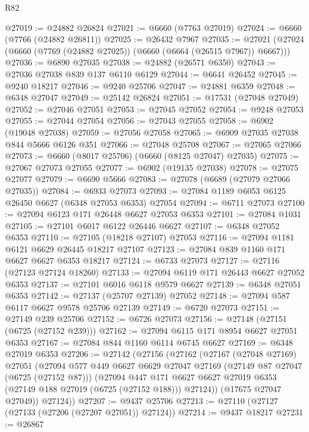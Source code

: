 \begin{lexlean}{R82}
\begin{coremodule}
@27019 := @24882 @26824
@27021 := @6660 (@7763 @27019)
@27024 := @6660 (@7766 (@24882 @26811))
@27025 := @26432 @7967
@27035 := @27021 (@27024 (@6660 (@7769 (@24882 @27025)) (@6660 (@6664 (@26515 @7967)) @6667)))
@27036 := @6890 @27035
@27038 := @24882 (@26571 @6350)
@27043 := @27036 @27038 @839 @137 @6110 @6129
@27044 := @6641 @26452
@27045 := @9240 @18217
@27046 := @9240 @25706
@27047 := @24881 @6359
@27048 := @6348 @27047
@27049 := @25142 @26824
@27051 := @17531 (@27048 @27049)
@27052 := @27046 @27051
@27053 := @27045 @27052
@27054 := @9248 @27053
@27055 := @27044 @27054
@27056 := @27043 @27055
@27058 := @6902 (@19048 @27038)
@27059 := @27056 @27058
@27065 := @6909 @27035 @27038 @844 @5666 @6126 @351
@27066 := @27048 @25708
@27067 := @27065 @27066
@27073 := @6660 (@8017 @25706) (@6660 (@8125 @27047) @27035)
@27075 := @27067 @27073 @27055
@27077 := @6902 (@19135 @27038)
@27078 := @27075 @27077
@27079 := @6690 @5666
@27083 := @27078 (@6689 (@27079 @27066 @27035))
@27084 := @6933 @27073
@27093 := @27084 @1189 @6053 @6125 @26450 @6627 (@6348 @27053 @6353) @27054
@27094 := @6711 @27073
@27100 := @27094 @6123 @171 @26448 @6627 @27053 @6353
@27101 := @27084 @1031
@27105 := @27101 @6017 @6122 @26446 @6627
@27107 := @6348 @27052 @6353
@27110 := @27105 (@18218 @27107) @27053
@27116 := @27094 @1181 @6121 @6629 @26445 @18217 @27107
@27123 := @27084 @839 @1160 @171 @6627 @6627 @6353 @18217
@27124 := @6733 @27073
@27127 := @27116 (@27123 @27124 @18260)
@27133 := @27094 @6119 @171 @26443 @6627 @27052 @6353
@27137 := @27101 @6016 @6118 @9579 @6627
@27139 := @6348 @27051 @6353
@27142 := @27137 (@25707 @27139) @27052
@27148 := @27094 @587 @6117 @6627 @9578 @25706 @27139
@27149 := @6720 @27073
@27151 := @27149 @239 @25706
@27152 := @6726 @27073
@27156 := @27148 (@27151 (@6725 (@27152 @239)))
@27162 := @27094 @6115 @171 @8954 @6627 @27051 @6353
@27167 := @27084 @844 @1160 @6114 @6745 @6627
@27169 := @6348 @27019 @6353
@27206 := @27142
    (@27156
      (@27162
        (@27167
          (@27048 @27169)
          @27051
          (@27094
            @577
            @449
            @6627
            @6629
            @27047
            @27169
            (@27149 @87 @27047 (@6725 (@27152 @87)))
            (@27094
              @447
              @171
              @6627
              @6627
              @27019
              @6353
              (@27149 @188 @27019 (@6725 (@27152 @188)))
              @27124))
          (@17675 @27047 @27049))
        @27124))
@27207 := @9437 @25706
@27213 := @27110 (@27127 (@27133 (@27206 (@27207 @27051)) @27124))
@27214 := @9437 @18217
@27231 := @26867

\end{coremodule}
\end{lexlean}
